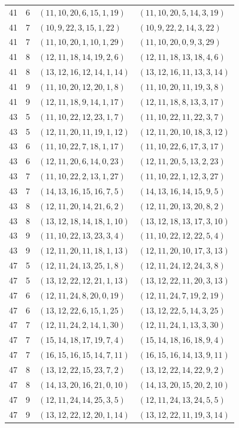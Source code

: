 \documentclass[11pt,a4paper,oneside,openany]{book}
\theoremstyle{definition}
\numberwithin{equation}{chapter}
\begin{document}
\begin{longtable}{rrll}
41&6&$(11,10,20,6,15,1,19)$&$(11,10,20,5,14,3,19)$\\
41&7&$(10,9,22,3,15,1,22)$&$(10,9,22,2,14,3,22)$\\
41&7&$(11,10,20,1,10,1,29)$&$(11,10,20,0,9,3,29)$\\
41&8&$(12,11,18,14,19,2,6)$&$(12,11,18,13,18,4,6)$\\
41&8&$(13,12,16,12,14,1,14)$&$(13,12,16,11,13,3,14)$\\
41&9&$(11,10,20,12,20,1,8)$&$(11,10,20,11,19,3,8)$\\
41&9&$(12,11,18,9,14,1,17)$&$(12,11,18,8,13,3,17)$\\
43&5&$(11,10,22,12,23,1,7)$&$(11,10,22,11,22,3,7)$\\
43&5&$(12,11,20,11,19,1,12)$&$(12,11,20,10,18,3,12)$\\
43&6&$(11,10,22,7,18,1,17)$&$(11,10,22,6,17,3,17)$\\
43&6&$(12,11,20,6,14,0,23)$&$(12,11,20,5,13,2,23)$\\
43&7&$(11,10,22,2,13,1,27)$&$(11,10,22,1,12,3,27)$\\
43&7&$(14,13,16,15,16,7,5)$&$(14,13,16,14,15,9,5)$\\
43&8&$(12,11,20,14,21,6,2)$&$(12,11,20,13,20,8,2)$\\
43&8&$(13,12,18,14,18,1,10)$&$(13,12,18,13,17,3,10)$\\
43&9&$(11,10,22,13,23,3,4)$&$(11,10,22,12,22,5,4)$\\
43&9&$(12,11,20,11,18,1,13)$&$(12,11,20,10,17,3,13)$\\
47&5&$(12,11,24,13,25,1,8)$&$(12,11,24,12,24,3,8)$\\
47&5&$(13,12,22,12,21,1,13)$&$(13,12,22,11,20,3,13)$\\
47&6&$(12,11,24,8,20,0,19)$&$(12,11,24,7,19,2,19)$\\
47&6&$(13,12,22,6,15,1,25)$&$(13,12,22,5,14,3,25)$\\
47&7&$(12,11,24,2,14,1,30)$&$(12,11,24,1,13,3,30)$\\
47&7&$(15,14,18,17,19,7,4)$&$(15,14,18,16,18,9,4)$\\
47&7&$(16,15,16,15,14,7,11)$&$(16,15,16,14,13,9,11)$\\
47&8&$(13,12,22,15,23,7,2)$&$(13,12,22,14,22,9,2)$\\
47&8&$(14,13,20,16,21,0,10)$&$(14,13,20,15,20,2,10)$\\
47&9&$(12,11,24,14,25,3,5)$&$(12,11,24,13,24,5,5)$\\
47&9&$(13,12,22,12,20,1,14)$&$(13,12,22,11,19,3,14)$\\

\end{longtable}
\end{document}
